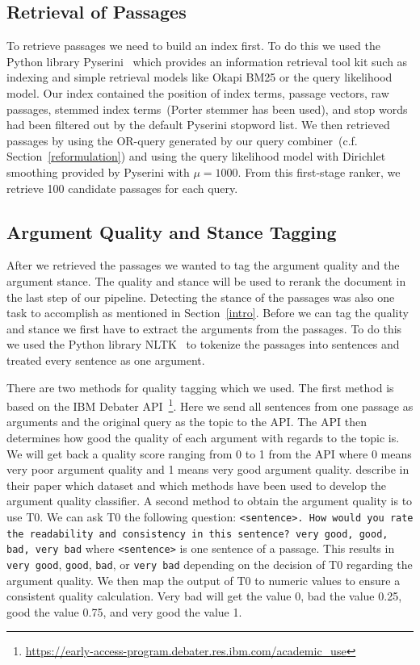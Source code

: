 \subsection{Retrieval of Passages}\label{retrieval}

To retrieve passages we need to build an index first.
To do this we used the Python library Pyserini~\cite{LinMLYPN2021} which provides an information retrieval tool kit such as indexing and simple retrieval models like Okapi BM25 or the query likelihood model.
Our index contained the position of index terms, passage vectors, raw passages, stemmed index terms~(Porter stemmer has been used), and stop words had been filtered out by the default Pyserini stopword list.
We then retrieved passages by using the OR-query generated by our query combiner~(c.f. Section~\ref{reformulation}) and using the query likelihood model with Dirichlet smoothing provided by Pyserini with \( \mu = 1000 \).
From this first-stage ranker, we retrieve 100 candidate passages for each query.

\subsection{Argument Quality and Stance Tagging}

After we retrieved the passages we wanted to tag the argument quality and the argument stance.
The quality and stance will be used to rerank the document in the last step of our pipeline.
Detecting the stance of the passages was also one task to accomplish as mentioned in Section~\ref{intro}.
Before we can tag the quality and stance we first have to extract the arguments from the passages.
To do this we used the Python library NLTK~\cite{BirdLK2009} to tokenize the passages into sentences and treated every sentence as one argument.

There are two methods for quality tagging which we used.
The first method is based on the IBM Debater API~\footnote{\url{https://early-access-program.debater.res.ibm.com/academic_use}}.
Here we send all sentences from one passage as arguments and the original query as the topic to the API.
The API then determines how good the quality of each argument with regards to the topic is.
We will get back a quality score ranging from 0 to 1 from the API where 0 means very poor argument quality and 1 means very good argument quality.
\citet{ToledoG2019} describe in their paper which dataset and which methods have been used to develop the argument quality classifier.
A second method to obtain the argument quality is to use T0.
We can ask T0 the following question: \texttt{<sentence>. How would you rate the readability and consistency in this sentence? very good, good, bad, very bad} where \texttt{<sentence>} is one sentence of a passage.
This results in \texttt{very good}, \texttt{good}, \texttt{bad}, or \texttt{very bad} depending on the decision of T0 regarding the argument quality.
We then map the output of T0 to numeric values to ensure a consistent quality calculation.
Very bad will get the value 0, bad the value 0.25, good the value 0.75, and very good the value 1. 

